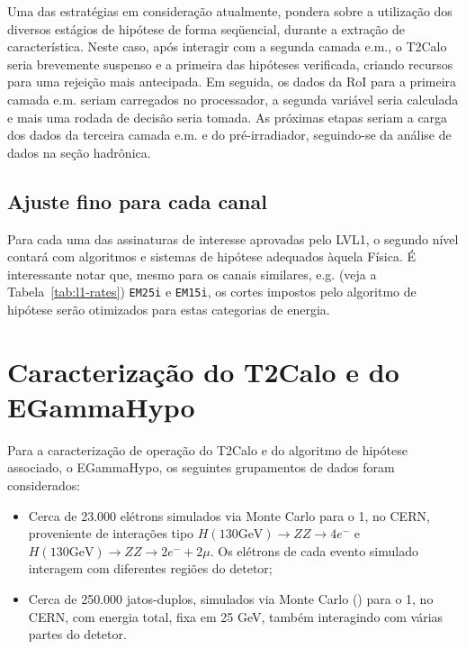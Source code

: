 Uma das estratégias em consideração atualmente, pondera sobre a utilização dos
diversos estágios de hipótese de forma seqüencial, durante a extração de
característica. Neste caso, após interagir com a segunda camada e.m., o T2Calo
seria brevemente suspenso e a primeira das hipóteses verificada, criando
recursos para uma rejeição mais antecipada. Em seguida, os dados da RoI para a
primeira camada e.m. seriam carregados no processador, a segunda variável
seria calculada e mais uma rodada de decisão seria tomada. As próximas etapas
seriam a carga dos dados da terceira camada e.m. e do pré-irradiador,
seguindo-se da análise de dados na seção hadrônica.

\subsection{Ajuste fino para cada canal}

Para cada uma das assinaturas de interesse aprovadas pelo LVL1, o segundo
nível contará com algoritmos e sistemas de hipótese adequados àquela Física. É
interessante notar que, mesmo para os canais similares, e.g. (veja a
Tabela~\ref{tab:l1-rates}) \texttt{EM25i} e \texttt{EM15i}, os cortes impostos
pelo algoritmo de hipótese serão otimizados para estas categorias de energia.


\section{Caracterização do T2Calo e do EGammaHypo}
\label{sec:def-eghypo}

Para a caracterização de operação do T2Calo e do algoritmo de hipótese
associado, o EGammaHypo, os seguintes grupamentos de dados foram
considerados:

\begin{itemize}
\item Cerca de 23.000 elétrons simulados via Monte Carlo para o  1, no CERN, proveniente de interações tipo $H (130
\text{GeV})\rightarrow ZZ
\rightarrow 4e^-$ e $H (130 \text{GeV})\rightarrow ZZ \rightarrow 2e^- +
2\mu$. Os elétrons de cada evento simulado interagem com diferentes regiões do
detetor;
\item Cerca de 250.000 jatos-duplos, simulados via Monte Carlo ()
para o  1, no CERN, com energia total, fixa em 25 GeV,
também interagindo com várias partes do detetor.
\end{itemize}

